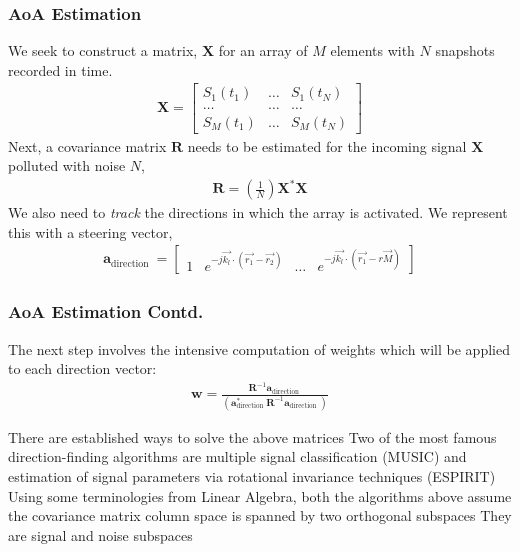 \documentclass[10pt]{beamer}
\begin{document}
\begin{frame}
    \frametitle{AoA Estimation}
    We seek to construct a matrix, $\mathbf{X}$ for an array of $M$ elements with $N$ snapshots recorded in time.
    \begin{align*}
        \mathbf{X}=\left[\begin{array}{ccc}
                S_{1}\left(t_{1}\right) & \ldots & S_{1}\left(t_{N}\right) \\
                \ldots                  & \ldots & \ldots                  \\
                S_{M}\left(t_{1}\right) & \ldots & S_{M}\left(t_{N}\right)
            \end{array}\right]
    \end{align*}
    Next, a covariance matrix $\mathbf{R}$ needs to be estimated for the incoming signal $\mathbf{X}$ polluted with noise $N$,
    \begin{align*}
        \mathbf{R}=\left(\frac{1}{N}\right) \mathbf{X}^{*} \mathbf{X}
    \end{align*}
    We also need to \textit{track} the directions in which the array is activated. We represent this with a steering vector,
    \begin{align*}
        \mathbf{a}_{\text {direction }}=\left[\begin{array}{llll}
                1 & e^{-j \overrightarrow{k_{l}} \cdot\left(\overrightarrow{r_{1}}-\overrightarrow{r_{2}}\right)} & \ldots & e^{-j \overrightarrow{k_{l}} \cdot\left(\overrightarrow{r_{1}}-r \vec{M}\right)}
            \end{array}\right]
    \end{align*}
\end{frame}

\begin{frame}
    \frametitle{AoA Estimation Contd.}

    The next step involves the intensive computation of weights which will be applied to each direction vector:
    \begin{align*}
        \mathbf{w}=\frac{\mathbf{R}^{-1} \mathbf{a}_{\text {direction }}}{\left(\mathbf{a}_{\text {direction }}^{*} \mathbf{R}^{-1} \mathbf{a}_{\text {direction }}\right)}
    \end{align*}

    \begin{outline}
        \1 There are established ways to solve the above matrices
        \1 Two of the most famous direction-finding algorithms are  multiple signal classification (MUSIC) and estimation of signal parameters via rotational invariance techniques (ESPIRIT)
        \1 Using some terminologies from Linear Algebra, both the algorithms above assume the covariance matrix column space is spanned by two orthogonal subspaces
        \2 They are signal and noise subspaces
    \end{outline}

\end{frame}
\end{document}

